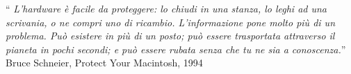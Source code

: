 \begin{flushright}
\vspace*{0.2\textheight}
\noindent\enquote{\itshape %
L'hardware è facile da proteggere: lo chiudi in una stanza, lo leghi ad una scrivania, o ne compri uno di ricambio. L'informazione pone molto più di un problema. Può esistere in più di un posto; può essere trasportata attraverso il pianeta in pochi secondi; e può essere rubata senza che tu ne sia a conoscenza.}\bigbreak
\hfill Bruce Schneier, Protect Your Macintosh, 1994
\end{flushright}
